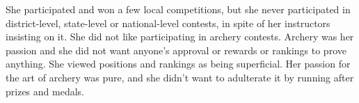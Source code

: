 She participated and won a few local competitions, but she never participated in
district-level, state-level or national-level contests, in spite of her
instructors insisting on it. She did not like participating in archery contests.
Archery was her passion and she did not want anyone's approval or rewards or
rankings to prove anything. She viewed positions and rankings as being
superficial. Her passion for the art of archery was pure, and she didn't want to
adulterate it by running after prizes and medals.
